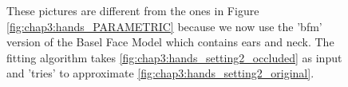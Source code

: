 \begin{figure}
	\centering
	\qquad
	\caption{These pictures are different from the ones in Figure \ref{fig:chap3:hands_PARAMETRIC} because we now use the 'bfm' version of the Basel Face Model which contains ears and neck. The fitting algorithm takes \ref{fig:chap3:hands_setting2_occluded} as input and 'tries' to approximate \ref{fig:chap3:hands_setting2_original}.}
	\label{fig:chap3:hands_setting2_PARAMETRIC}
\end{figure}

